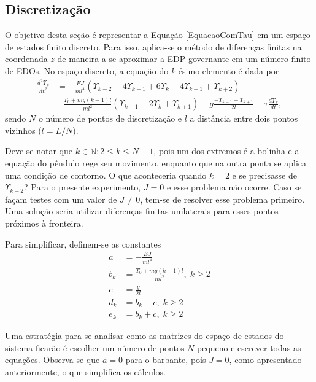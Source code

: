 \subsection{Discretização}
O objetivo desta seção é representar a Equação \ref{EquacaoComTau} em um espaço de estados finito discreto.  Para isso, aplica-se o método de diferenças finitas na coordenada $z$ de maneira a se aproximar a EDP governante em um número finito de EDOs. No espaço discreto, a equação do $k$-ésimo elemento é dada por \begin{align}
	\frac{d^2\Upsilon_k}{dt^2} &= -\frac{EJ}{m l^4}\left(\Upsilon_{k-2} - 4\Upsilon_{k-1}+6\Upsilon_{k}-4\Upsilon_{k+1}+\Upsilon_{k+2}\right)\nonumber\\
	&+ \frac{T_0+mg(k-1)l}{m l^2}\left(\Upsilon_{k-1}-2\Upsilon_{k} + \Upsilon_{k+1}\right)+g\frac{-\Upsilon_{k-1}+\Upsilon_{k+1}}{2l}-\tau\frac{d\Upsilon_k}{dt},
\end{align} sendo $N$ o número de pontos de discretização e $l$ a distância entre dois pontos vizinhos ($l = L/N$).

 Deve-se notar que $k\in \mathbb{N}:2\le k \le N-1$, pois um dos extremos é a bolinha e a equação do pêndulo rege seu movimento, enquanto que na outra ponta se aplica uma condição de contorno. O que aconteceria quando $k=2$ e se precisasse de $\Upsilon_{k-2}$? Para o presente experimento, $J=0$ e esse problema não ocorre. Caso se façam testes com um valor de $J\neq 0$, tem-se de resolver esse problema primeiro. Uma solução seria utilizar diferenças finitas unilaterais para esses pontos próximos à fronteira.

 Para simplificar, definem-se as constantes \begin{align}
	a &= -\frac{EJ}{m l^4}\\
	b_k &= \frac{T_0 + mg(k-1)l}{m l^2},\; k\ge 2\\
	c &= \frac{g}{2l}\\
	d_k &= b_k - c,\; k\ge 2\\
	e_k &= b_k + c,\; k\ge 2
\end{align}

 Uma estratégia para se analisar como as matrizes do espaço de estados do sistema ficarão é escolher um número de pontos $N$ pequeno e escrever todas as equações. Observa-se que $a=0$ para o barbante, pois $J=0$, como apresentado anteriormente, o que simplifica os cálculos.

